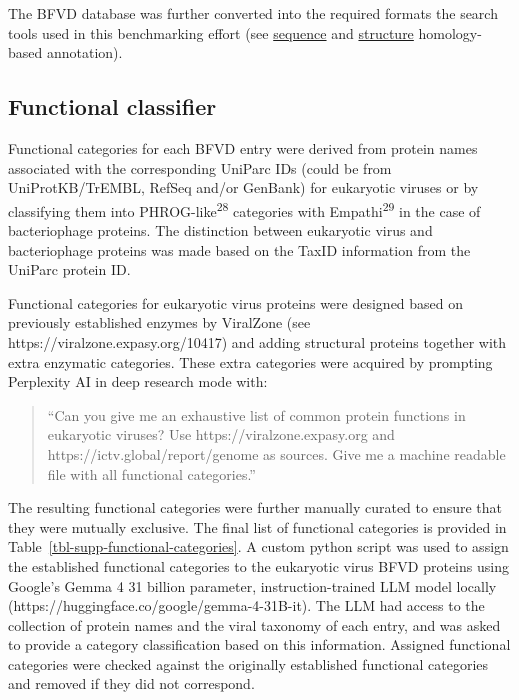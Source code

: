 \documentclass[
  sn-nature,
]{sn-jnl}
\begin{document}
The BFVD database was further converted into the required formats the
search tools used in this benchmarking effort (see
\hyperref[sequence-homology-based-annotation]{sequence} and
\hyperref[structure-homology-based-annotation]{structure} homology-based
annotation).

\subsection{Functional classifier}\label{functional-classifier}

Functional categories for each BFVD entry were derived from protein
names associated with the corresponding UniParc IDs (could be from
UniProtKB/TrEMBL, RefSeq and/or GenBank) for eukaryotic viruses or by
classifying them into PHROG-like\textsuperscript{28} categories with
Empathi\textsuperscript{29} in the case of bacteriophage proteins. The
distinction between eukaryotic virus and bacteriophage proteins was made
based on the TaxID information from the UniParc protein ID.

Functional categories for eukaryotic virus proteins were designed based
on previously established enzymes by ViralZone (see
https://viralzone.expasy.org/10417) and adding structural proteins
together with extra enzymatic categories. These extra categories were
acquired by prompting Perplexity AI in deep research mode with:

\begin{quote}
``Can you give me an exhaustive list of common protein functions in
eukaryotic viruses? Use https://viralzone.expasy.org and
https://ictv.global/report/genome as sources. Give me a machine readable
file with all functional categories.''
\end{quote}

The resulting functional categories were further manually curated to
ensure that they were mutually exclusive. The final list of functional
categories is provided in Table~\ref{tbl-supp-functional-categories}. A
custom python script was used to assign the established functional
categories to the eukaryotic virus BFVD proteins using Google's Gemma 4
31 billion parameter, instruction-trained LLM model locally
(https://huggingface.co/google/gemma-4-31B-it). The LLM had access to
the collection of protein names and the viral taxonomy of each entry,
and was asked to provide a category classification based on this
information. Assigned functional categories were checked against the
originally established functional categories and removed if they did not
correspond.
\end{document}
